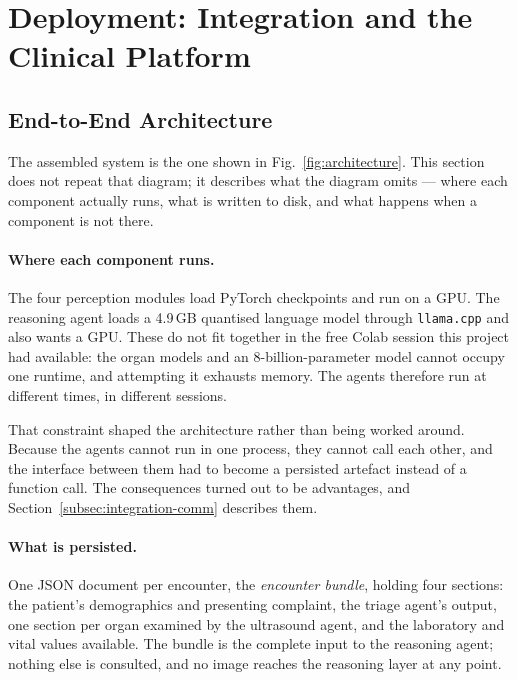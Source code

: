 \section{Deployment: Integration and the Clinical Platform}
\label{sec:integration}

\subsection{End-to-End Architecture}
\label{subsec:integration-arch}

The assembled system is the one shown in Fig.~\ref{fig:architecture}. This section does not
repeat that diagram; it describes what the diagram omits --- where each component actually
runs, what is written to disk, and what happens when a component is not there.

\paragraph{Where each component runs.} The four perception modules load PyTorch checkpoints and
run on a GPU. The reasoning agent loads a 4.9\,GB quantised language model through
\texttt{llama.cpp} and also wants a GPU. These do not fit together in the free Colab session
this project had available: the organ models and an 8-billion-parameter model cannot occupy one
runtime, and attempting it exhausts memory. The agents therefore run at different times, in
different sessions.

That constraint shaped the architecture rather than being worked around. Because the agents
cannot run in one process, they cannot call each other, and the interface between them had to
become a persisted artefact instead of a function call. The consequences turned out to be
advantages, and Section~\ref{subsec:integration-comm} describes them.

\paragraph{What is persisted.} One JSON document per encounter, the \emph{encounter bundle},
holding four sections: the patient's demographics and presenting complaint, the triage agent's
output, one section per organ examined by the ultrasound agent, and the laboratory and vital
values available. The bundle is the complete input to the reasoning agent; nothing else is
consulted, and no image reaches the reasoning layer at any point.

